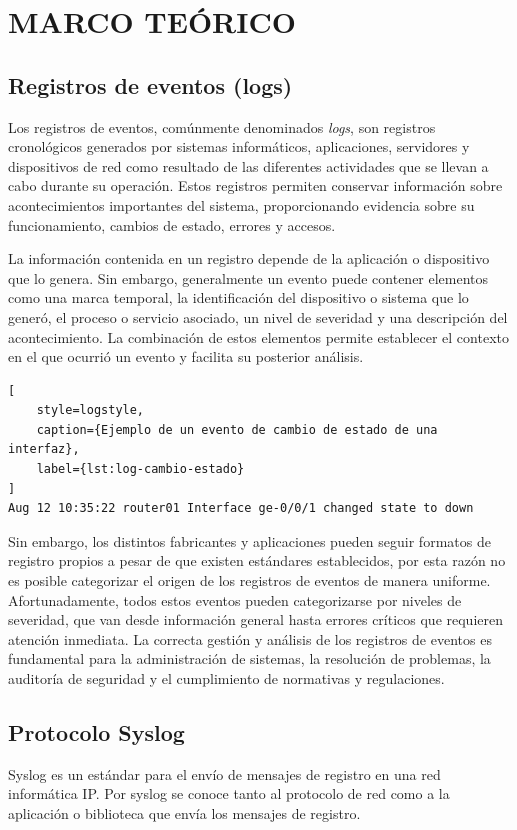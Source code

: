 \chapter{MARCO TEÓRICO}
\section{Registros de eventos (logs)}
Los registros de eventos, comúnmente denominados \textit{logs}, son registros cronológicos generados por sistemas informáticos, aplicaciones, servidores y dispositivos de red como resultado de las diferentes actividades que se llevan a cabo durante su operación. Estos registros permiten conservar información sobre acontecimientos importantes del sistema, proporcionando evidencia sobre su funcionamiento, cambios de estado, errores y accesos.

La información contenida en un registro depende de la aplicación o dispositivo que lo genera. Sin embargo, generalmente un evento puede contener elementos como una marca temporal, la identificación del dispositivo o sistema que lo generó, el proceso o servicio asociado, un nivel de severidad y una descripción del acontecimiento. La combinación de estos elementos permite establecer el contexto en el que ocurrió un evento y facilita su posterior análisis.

\begin{lstlisting}[
    style=logstyle,
    caption={Ejemplo de un evento de cambio de estado de una interfaz},
    label={lst:log-cambio-estado}
]
Aug 12 10:35:22 router01 Interface ge-0/0/1 changed state to down
\end{lstlisting}

Sin embargo, los distintos fabricantes y aplicaciones pueden seguir formatos de registro propios a pesar de que existen estándares establecidos, por esta razón no es posible categorizar el origen de los registros de eventos de manera uniforme.
Afortunadamente, todos estos eventos pueden categorizarse por niveles de severidad, que van desde información general hasta errores críticos que requieren atención inmediata. La correcta gestión y análisis de los registros de eventos es fundamental para la administración de sistemas, la resolución de problemas, la auditoría de seguridad y el cumplimiento de normativas y regulaciones.

\section{Protocolo Syslog}
Syslog es un estándar para el envío de mensajes de registro en una red informática IP. Por syslog se conoce tanto al protocolo de red como a la aplicación o biblioteca que envía los mensajes de registro.

